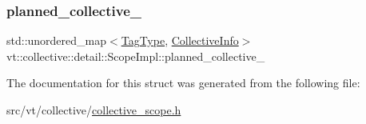 \subsubsection{\texorpdfstring{planned\+\_\+collective\+\_\+}{planned\_collective\_}}
{\footnotesize\ttfamily std\+::unordered\+\_\+map$<$\hyperlink{namespacevt_a84ab281dae04a52a4b243d6bf62d0e52}{Tag\+Type}, \hyperlink{structvt_1_1collective_1_1detail_1_1_scope_impl_1_1_collective_info}{Collective\+Info}$>$ vt\+::collective\+::detail\+::\+Scope\+Impl\+::planned\+\_\+collective\+\_\+\hspace{0.3cm}{\ttfamily [private]}}



The documentation for this struct was generated from the following file\+:\begin{DoxyCompactItemize}
\item 
src/vt/collective/\hyperlink{collective__scope_8h}{collective\+\_\+scope.\+h}\end{DoxyCompactItemize}
